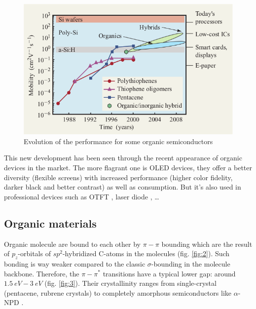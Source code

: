 \begin{figure}
    \centering
    \includegraphics[width=.6\paperwidth]{figures/evolution_perf.png}
    \caption{Evolution of the performance for some organic semiconductors \label{fig:1}\cite{IBM}}
\end{figure}

This new development has been seen through the recent appearance of organic devices in the market. The more flagrant one is OLED devices, they offer a better diversity (flexible screens) with increased performance (higher color fidelity, darker black and better contrast) as well as consumption. But it's also used in professional devices such as OTFT \cite{OTFT}, laser diode \cite{laserDiode}, \dots

\subsection{Organic materials}

Organic molecule are bound to each other by $\pi - \pi$ bounding which are the result of $p_z$-orbitals of $sp^2$-hybridized C-atoms in the molecules (fig. \ref{fig:2}). Such bonding is way weaker compared to the classic $\sigma$-bounding in the molecule backbone. Therefore, the $\pi-\pi^*$ transitions have a typical lower gap: around $\SI{1.5}{eV}-\SI{3}{eV}$ (fig. \ref{fig:3}). Their crystallinity ranges from single-crystal (pentacene, rubrene crystals) \cite{mono_crystal} to completely amorphous semiconductors like $\alpha$-NPD \cite{amorphous}.

